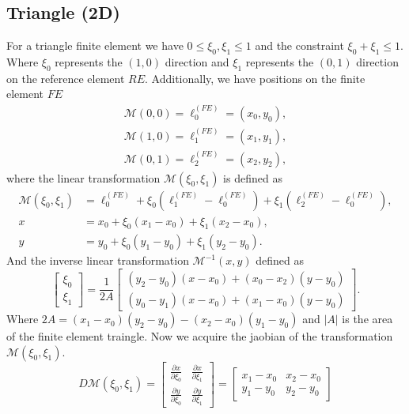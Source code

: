 \documentclass[12pt]{ociamthesis}
\begin{document}
\subsection{Triangle (2D)}
For a triangle finite element we have $0 \leq \xi_0, \xi_1 \leq 1$ and the constraint $\xi_0+\xi_1 \leq 1$. Where $\xi_0$ represents the $(1,0)$ direction and $\xi_1$ represents the $(0,1)$ direction on the reference element $RE$. Additionally, we have positions on the finite element $FE$
\begin{align}
\mathcal{M}(0,0) = \ell_0^{(FE)} = (x_0, y_0), \\
\mathcal{M}(1,0) = \ell_1^{(FE)} = (x_1, y_1), \\
\mathcal{M}(0,1) = \ell_2^{(FE)} = (x_2, y_2),
\end{align}
where the linear transformation $\mathcal{M}(\xi_0,\xi_1)$ is defined as 
\begin{align}
    \mathcal{M}(\xi_0,\xi_1) &= \ell_0^{(FE)} + \xi_0(\ell_1^{(FE)}-\ell_0^{(FE)})+ \xi_1(\ell_2^{(FE)}-\ell_0^{(FE)}),\\
    x &= x_0 + \xi_0(x_1-x_0)+\xi_1(x_2-x_0), \\
    y &= y_0 + \xi_0(y_1-y_0)+\xi_1(y_2-y_0).
\end{align}
And the inverse linear transformation $\mathcal{M}^{-1}(x,y)$ defined as
\begin{equation} \label{Map_In_Tri}
\left [
\begin{matrix}
\xi_0 \\
\xi_1
\end{matrix}
\right ] =
\frac{1}{2A}
\left [
\begin{matrix}
(y_2-y_0)(x-x_0)+(x_0-x_2)(y-y_0)\\
(y_0-y_1)(x-x_0)+(x_1-x_0)(y-y_0)
\end{matrix}
\right ].
\end{equation}
Where $2A=(x_1-x_0)(y_2-y_0)-(x_2-x_0)(y_1-y_0)$ and $|A|$ is the area of the finite element traingle. Now we acquire the jaobian of the transformation $\mathcal{M}(\xi_0, \xi_1)$.
\begin{equation}
D\mathcal{M}(\xi_0, \xi_1) = 
\left [
\begin{matrix}
\frac{\partial x}{\partial \xi_0} & \frac{\partial x}{\partial \xi_1} \\
\frac{\partial y}{\partial \xi_0} & \frac{\partial y}{\partial \xi_1}
\end{matrix}
\right ] = 
\left [
\begin{matrix}
x_1-x_0 & x_2-x_0 \\
y_1-y_0 & y_2-y_0
\end{matrix}
\right ]
\end{equation}
\end{document}
